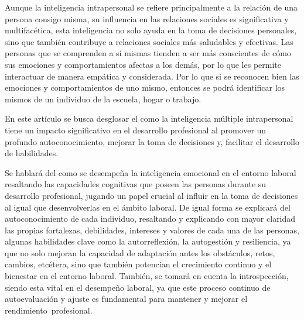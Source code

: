Aunque la inteligencia intrapersonal se refiere principalmente a la relación de una persona consigo misma, su influencia en las relaciones sociales es significativa y multifacética, esta inteligencia no solo ayuda en la toma de decisiones personales, sino que también contribuye a relaciones sociales más saludables y efectivas. Las personas que se comprenden a sí mismas tienden a ser más conscientes de cómo sus emociones y comportamientos afectas a los demás, por lo que les permite interactuar de manera empática y considerada. 
Por lo que si se reconocen bien las emociones y comportamientos de uno mismo, entonces se podrá identificar los mismos de un individuo de la escuela, hogar o trabajo. 

En este artículo se busca desglosar el como la inteligencia múltiple intrapersonal tiene un impacto significativo en el desarrollo profesional al promover un profundo autoconocimiento, mejorar la toma de decisiones y, facilitar el desarrollo de habilidades.

Se hablará del como se desempeña la inteligencia emocional en el entorno laboral resaltando las capacidades cognitivas que poseen las personas durante su desarrollo profesional, jugando un papel crucial al influir en la toma de decisiones al igual que desenvolverlas en el ámbito laboral.
De igual forma se explicará del autoconocimiento de cada individuo, resaltando y explicando con mayor claridad las propias fortalezas, debilidades, intereses y valores de cada una de las personas, algunas habilidades clave como la autorreflexión, la autogestión y resiliencia, ya que no solo mejoran la capacidad de adaptación antes los obstáculos, retos, cambios, etcétera, sino que también potencian el crecimiento continuo y el bienestar en el entorno laboral. 
También, se tomará en cuenta la introspección, siendo esta vital en el desempeño laboral, ya que este proceso continuo de autoevaluación y ajuste es fundamental para mantener y mejorar el rendimiento profesional.